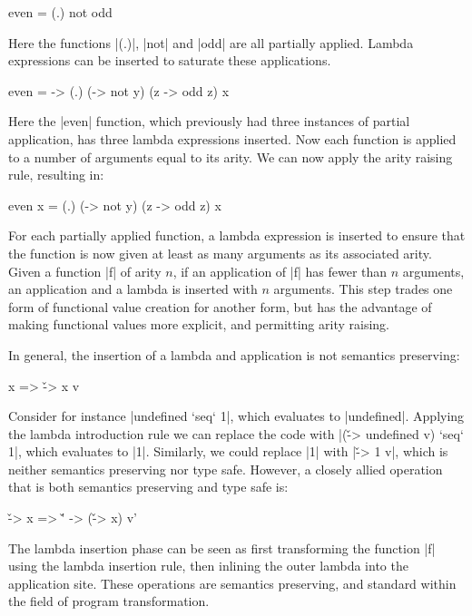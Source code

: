 \documentclass[preprint]{sigplanconf}
\begin{document}
\begin{example}
\begin{code}
even = (.) not odd
\end{code}

Here the functions |(.)|, |not| and |odd| are all partially applied. Lambda expressions can be inserted to saturate these applications.

\begin{code}
even = \x -> (.) (\y -> not y) (z -> odd z) x
\end{code}

Here the |even| function, which previously had three instances of partial application, has three lambda expressions inserted. Now each function is applied to a number of arguments equal to its arity. We can now apply the arity raising rule, resulting in:

\begin{code}
even x = (.) (\y -> not y) (z -> odd z) x
\end{code}
\end{example}

For each partially applied function, a lambda expression is inserted to ensure that the function is now given at least as many arguments as its associated arity. Given a function |f| of arity $n$, if an application of |f| has fewer than $n$ arguments, an application and a lambda is inserted with $n$ arguments. This step trades one form of functional value creation for another form, but has the advantage of making functional values more explicit, and permitting arity raising.

In general, the insertion of a lambda and application is not semantics preserving:

\begin{code}
x => \v -> x v
\end{code}

Consider for instance |undefined `seq` 1|, which evaluates to |undefined|. Applying the lambda introduction rule we can replace the code with |(\v -> undefined v) `seq` 1|, which evaluates to |1|. Similarly, we could replace |1| with |\v -> 1 v|, which is neither semantics preserving nor type safe. However, a closely allied operation that is both semantics preserving and type safe is:

\begin{code}
\v -> x => \v' -> (\v -> x) v'
\end{code}

The lambda insertion phase can be seen as first transforming the function |f| using the lambda insertion rule, then inlining the outer lambda into the application site. These operations are semantics preserving, and standard within the field of program transformation.
\end{document}
